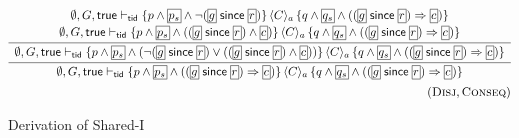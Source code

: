 \begin{figure*}
\[\begin{array}{@{}c@{}}
\\[4ex]
%
  \infer
    {
    \emptyset,G,\true \vdash_\ltid 
    \{p  \land \shared{p_s} \land ((\shared{g} \since \shareds{r}) \Rightarrow \shareds{c})\} \,
    \langle C \rangle_a \,
    \{ q  \land \shared{q_s} \land ((\shared{g} \since \shareds{r}) \Rightarrow \shareds{c}) \}
    }
    { %
    \infer
    {
    \begin{array}{c}  
    \emptyset,G,\true \vdash_\ltid 
    \{p  \land \shared{p_s} \land (\neg(\shared{g} \since \shared{r}) \lor ((\shared{g} \since \shared{r}) \land \shared{c}))\} 
\,    \langle C \rangle_a \,
    \{ q \land \shared{q_s} \land ((\shared{g} \since \shareds{r}) \Rightarrow \shareds{c})  \}    
    \end{array}
    }
    {
    \begin{array}{c}  
    \emptyset,G,\true \vdash_\ltid 
    \{p \land \shared{p_s}  \land \neg(\shared{g} \since \shared{r}) \} 
    \,    \langle C \rangle_a \,
    \{ q \land \shared{q_s} \land ((\shared{g} \since
    \shareds{r}) \Rightarrow \shareds{c})  \}    
    \\[2pt]
    \emptyset,G,\true \vdash_\ltid 
    \{p  \land \shared{p_s} \land ((\shared{g} \since \shareds{r}) \land \shareds{c})\} 
    \,    \langle C \rangle_a \,
    \{ q \land \shared{q_s} \land  ((\shared{g} \since \shared{r}) \Rightarrow \shareds{c}) \}    
    \end{array}
   }
   }
\\[5pt]
\hfill (\textsc{Disj}, \textsc{Conseq})
\end{array}
\]
\caption{\small \label{fig:SharedIDerivation}Derivation of {\sc Shared-I}}
\end{figure*}


